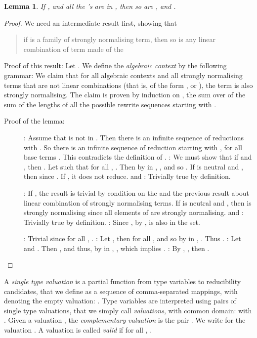 \documentclass[colorlinks=true,linkcolor=black,urlcolor=black,citecolor=blue,submission,copyright,creativecommons]{eptcs}
\newtheorem{lemma}[theorem]{Lemma}
\begin{document}
\begin{lemma}\label{lem:RCop}
  If ,  and all the 's are in ,
  then so are ,  and
  .
\end{lemma}
\begin{proof}
We need an intermediate result first, showing that
\begin{quote}
if  is a family of strongly normalising term, then so is any linear combination of term made of the 
\end{quote}
Proof of this result: Let .  We define the
  {\em algebraic context}  by the following grammar: 
We claim that for all algebraic contexts  and all strongly
  normalising terms  that are not linear combinations (that
  is, of the form ,  or ), the term
   is also strongly normalising.
The claim is proven by induction on , the sum over
   of the sum of the lengths of all the possible rewrite sequences
  starting with .

\noindent Proof of the lemma:
  \begin{description}
   \item[]
	 : Assume that  is not in . Then there is an infinite sequence of reductions  with .  So there is an infinite sequence of reduction  starting with , for all base terms .  This contradicts the definition of .
: We must show that if  and , then . Let  such that for all , . Then by  in , , and so .  If  is neutral and , then  since . If , it does not reduce.
 and : Trivially true by definition.
\item[]
	 : If , the result is trivial by
           condition  on the  and the previous result about linear combination of strongly normalising terms. If  is neutral and , then  is strongly normalising since all elements of  are strongly normalising.
 and : Trivially true by definition.
: Since , by ,  is also in
           the set.
\item[]
	 : Trivial since for all , .
: Let , then for all ,  and so by  in , . Thus .
: Let  and . Then , and thus, by  in , , which implies .
: By , , then .\qedhere
   \end{description}
\end{proof}

A \emph{single type valuation} is a partial function from type variables to reducibility candidates, that we define as a sequence of comma-separated mappings, with  denoting the empty valuation:
.
Type variables are interpreted using pairs of single type valuations, that we simply call {\em valuations}, with common domain:
 with .
Given a valuation , the {\em complementary valuation}  is the pair . We write  for the valuation . A valuation is called \emph{valid} if for all , .
\end{document}
